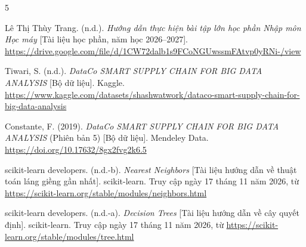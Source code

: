 \setlength{\bibhang}{1.27cm}
\setlength{\bibsep}{6pt}
\begin{thebibliography}{5}
\raggedright
{}
Lê Thị Thùy Trang. (n.d.). \textit{Hướng dẫn thực hiện bài tập lớn học phần Nhập môn Học máy} [Tài liệu học phần, năm học 2026–2027]. \url{https://drive.google.com/file/d/1CW72dalb1s9FCoNGUwssmFAtvp0yRNi-/view}

Tiwari, S. (n.d.). \textit{DataCo SMART SUPPLY CHAIN FOR BIG DATA ANALYSIS} [Bộ dữ liệu]. Kaggle. \url{https://www.kaggle.com/datasets/shashwatwork/dataco-smart-supply-chain-for-big-data-analysis}

Constante, F. (2019). \textit{DataCo SMART SUPPLY CHAIN FOR BIG DATA ANALYSIS} (Phiên bản 5) [Bộ dữ liệu]. Mendeley Data. \url{https://doi.org/10.17632/8gx2fvg2k6.5}

scikit-learn developers. (n.d.-b). \textit{Nearest Neighbors} [Tài liệu hướng dẫn về thuật toán láng giềng gần nhất]. scikit-learn. Truy cập ngày 17 tháng 11 năm 2026, từ \url{https://scikit-learn.org/stable/modules/neighbors.html}

scikit-learn developers. (n.d.-a). \textit{Decision Trees} [Tài liệu hướng dẫn về cây quyết định]. scikit-learn. Truy cập ngày 17 tháng 11 năm 2026, từ \url{https://scikit-learn.org/stable/modules/tree.html}
\end{thebibliography}
